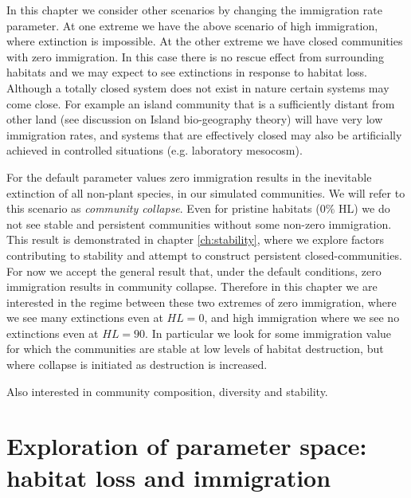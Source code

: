 \begin{itemize}
In this chapter we consider other scenarios by changing the immigration rate parameter. At one extreme we have the above scenario of high immigration, where extinction is impossible. At the other extreme we have closed communities with zero immigration. In this case there is no rescue effect from surrounding habitats and we may expect to see extinctions in response to habitat loss. Although a totally closed system does not exist in nature certain systems may come close. For example an island community that is a sufficiently distant from other land (see discussion on Island bio-geography theory) will have very low immigration rates, and systems that are effectively closed may also be artificially achieved in controlled situations (e.g. laboratory mesocosm).

For the default parameter values zero immigration results in the inevitable extinction of all non-plant species, in our simulated communities. We will refer to this scenario as \emph{community collapse}. Even for pristine habitats ($0\%$ HL) we do not see stable and persistent communities without some non-zero immigration. This result is demonstrated in chapter \ref{ch:stability}, where we explore factors contributing to stability and attempt to construct persistent closed-communities. For now we accept the general result that, under the default conditions, zero immigration results in community collapse. Therefore in this chapter we are interested in the regime between these two extremes of zero immigration, where we see many extinctions even at $HL=0$, and high immigration where we see no extinctions even at $HL=90$. In particular we look for some immigration value for which the communities are stable at low levels of habitat destruction, but where collapse is initiated as destruction is increased.

Also interested in community composition, diversity and stability.

\newpage
\section{Exploration of parameter space: habitat loss and immigration}
\label{sec:heatmaps}


\end{itemize}

